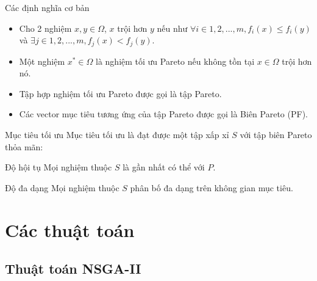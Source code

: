 \documentclass{beamer}
\begin{document}
    \begin{frame}{Các định nghĩa cơ bản}
        \begin{itemize}
            \item <1-> Cho 2 nghiệm $x, y \in \Omega $, $x$ trội hơn $y$ nếu như $\forall i \in {1,2,...,m}, f_{i}(x) \leq f_{i}(y)$ và $ \exists j \in {1,2,...,m}, f_{j}(x) < f_{j}(y)$. 
            \item <2-> Một nghiệm $x^{*} \in \Omega$ là nghiệm tối ưu Pareto nếu không tồn tại $x \in \Omega$ trội hơn nó.
            \item <3-> Tập hợp nghiệm tối ưu Pareto được gọi là tập Pareto.
            \item <4-> Các vector mục tiêu tương ứng của tập Pareto được gọi là Biên Pareto (PF).
        \end{itemize}
    \end{frame}

    \begin{frame}{Mục tiêu tối ưu}
        Mục tiêu tối ưu là đạt được một tập xấp xỉ $S$ với tập biên Pareto thỏa mãn:
        \pause
        \begin{block}{Độ hội tụ}
            Mọi nghiệm thuộc $S$ là gần nhất có thể với $P$.
        \end{block}
        \pause
        \begin{block}{Độ đa dạng}
            Mọi nghiệm thuộc $S$ phân bố đa dạng trên không gian mục tiêu.
        \end{block}
    \end{frame}


\section{\textbf{Các thuật toán}}
\subsection{\textbf{Thuật toán NSGA-II}}
\end{document}
